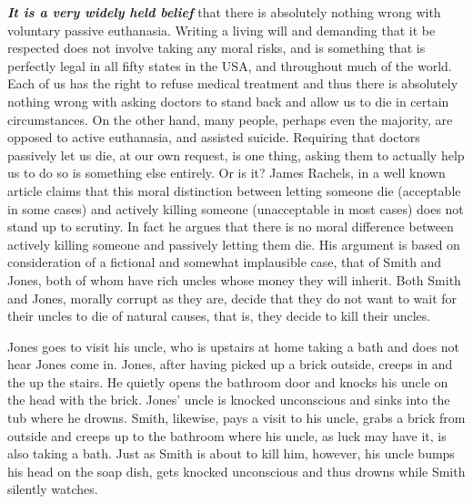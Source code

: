 \documentclass[
  12pt, openany]{book}
\begin{document}
\textbf{\emph{It is a very widely held belief}} that there is absolutely nothing wrong with voluntary passive euthanasia. Writing a living will and demanding that it be respected does not involve taking any moral risks, and is something that is perfectly legal in all fifty states in the USA, and throughout much of the world. Each of us has the right to refuse medical treatment and thus there is absolutely nothing wrong with asking doctors to stand back and allow us to die in certain circumstances. On the other hand, many people, perhaps even the majority, are opposed to active euthanasia, and assisted suicide. Requiring that doctors passively let us die, at our own request, is one thing, asking them to actually help us to do so is something else entirely. Or is it? James Rachels, in a well known article claims that this moral distinction between letting someone die (acceptable in some cases) and actively killing someone (unacceptable in most cases) does not stand up to scrutiny. In fact he argues that there is no moral difference between actively killing someone and passively letting them die. His argument is based on consideration of a fictional and somewhat implausible case, that of Smith and Jones, both of whom have rich uncles whose money they will inherit. Both Smith and Jones, morally corrupt as they are, decide that they do not want to wait for their uncles to die of natural causes, that is, they decide to kill their uncles.

\begin{center}

\begin{example}

Jones goes to visit his uncle, who is upstairs at home taking a bath and does not hear Jones come in. Jones, after having picked up a brick outside, creeps in and the up the stairs. He quietly opens the bathroom door and knocks his uncle on the head with the brick. Jones' uncle is knocked unconscious and sinks into the tub where he drowns. Smith, likewise, pays a visit to his uncle, grabs a brick from outside and creeps up to the bathroom where his uncle, as luck may have it, is also taking a bath. Just as Smith is about to kill him, however, his uncle bumps his head on the soap dish, gets knocked unconscious and thus drowns while Smith silently watches.

\end{example}

\end{center}
\end{document}
